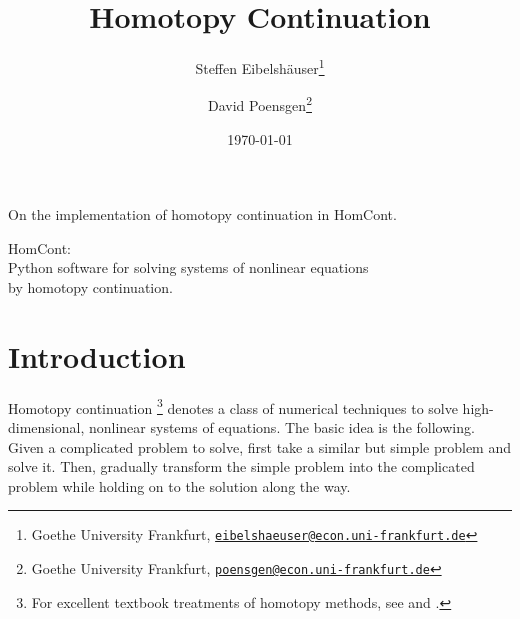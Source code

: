 \documentclass[11pt,fleqn]{article}
\begin{document}

\date{\today}
\title{Homotopy Continuation}

\author{
Steffen Eibelshäuser\footnote{Goethe University Frankfurt, \href{mailto:eibelshaeuser@econ.uni-frankfurt.de}{\nolinkurl{eibelshaeuser@econ.uni-frankfurt.de}}} %
\and %
David Poensgen\footnote{Goethe University Frankfurt, \href{mailto:poensgen@econ.uni-frankfurt.de}{\nolinkurl{poensgen@econ.uni-frankfurt.de}}}
}

\maketitle
\thispagestyle{empty}

\noindent On the implementation of homotopy continuation in HomCont.

\vspace{2em}
\noindent HomCont: \\ Python software for solving systems of nonlinear equations \\ by homotopy continuation.

\vspace{4em}







\begin{spacing}{0.75}
\tableofcontents
\thispagestyle{empty}
\end{spacing}
\vspace{4em}
\pagebreak








\section{Introduction}


Homotopy continuation%
\footnote{%
For excellent textbook treatments of homotopy methods, see \cite{ZangwillGarcia1981} and \cite{AllgowerGeorg1990}.%
} %
denotes a class of numerical techniques to solve high-dimensional, nonlinear systems of equations. The basic idea is the following. Given a complicated problem to solve, first take a similar but simple problem and solve it. Then, gradually transform the simple problem into the complicated problem while holding on to the solution along the way.
\end{document}
